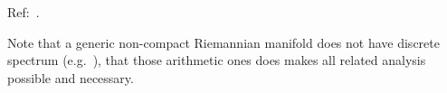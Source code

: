 \documentclass[0-main]{subfiles}
\begin{document}
\ifSubfilesClassLoaded{
	\tableofcontents
}{}


Ref:~\cite{Deligne1979Shimura,Deligne1971Travaux}.

Note that a generic non-compact Riemannian manifold does not have discrete spectrum (e.g.~\cite{ArthurYau}), that those arithmetic ones does makes all related analysis possible and necessary.





\ifSubfilesClassLoaded{
	
	
}{}
\end{document}
